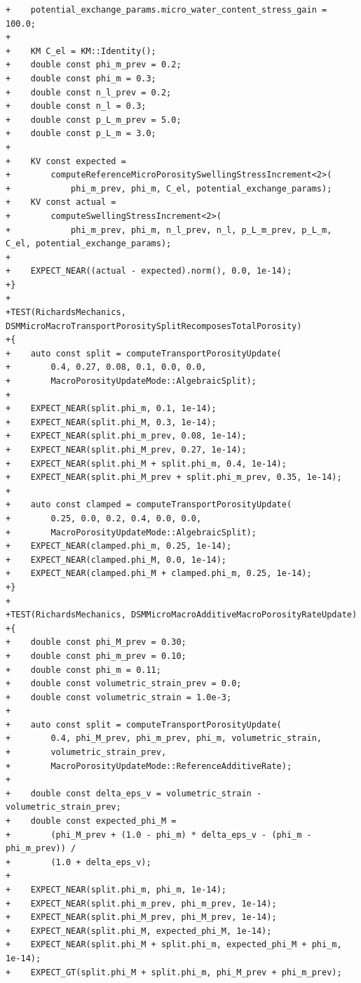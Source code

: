 \documentclass[10pt]{article}
\begin{document}
\begin{lstlisting}
+    potential_exchange_params.micro_water_content_stress_gain = 100.0;
+
+    KM C_el = KM::Identity();
+    double const phi_m_prev = 0.2;
+    double const phi_m = 0.3;
+    double const n_l_prev = 0.2;
+    double const n_l = 0.3;
+    double const p_L_m_prev = 5.0;
+    double const p_L_m = 3.0;
+
+    KV const expected =
+        computeReferenceMicroPorositySwellingStressIncrement<2>(
+            phi_m_prev, phi_m, C_el, potential_exchange_params);
+    KV const actual =
+        computeSwellingStressIncrement<2>(
+            phi_m_prev, phi_m, n_l_prev, n_l, p_L_m_prev, p_L_m, C_el, potential_exchange_params);
+
+    EXPECT_NEAR((actual - expected).norm(), 0.0, 1e-14);
+}
+
+TEST(RichardsMechanics, DSMMicroMacroTransportPorositySplitRecomposesTotalPorosity)
+{
+    auto const split = computeTransportPorosityUpdate(
+        0.4, 0.27, 0.08, 0.1, 0.0, 0.0,
+        MacroPorosityUpdateMode::AlgebraicSplit);
+
+    EXPECT_NEAR(split.phi_m, 0.1, 1e-14);
+    EXPECT_NEAR(split.phi_M, 0.3, 1e-14);
+    EXPECT_NEAR(split.phi_m_prev, 0.08, 1e-14);
+    EXPECT_NEAR(split.phi_M_prev, 0.27, 1e-14);
+    EXPECT_NEAR(split.phi_M + split.phi_m, 0.4, 1e-14);
+    EXPECT_NEAR(split.phi_M_prev + split.phi_m_prev, 0.35, 1e-14);
+
+    auto const clamped = computeTransportPorosityUpdate(
+        0.25, 0.0, 0.2, 0.4, 0.0, 0.0,
+        MacroPorosityUpdateMode::AlgebraicSplit);
+    EXPECT_NEAR(clamped.phi_m, 0.25, 1e-14);
+    EXPECT_NEAR(clamped.phi_M, 0.0, 1e-14);
+    EXPECT_NEAR(clamped.phi_M + clamped.phi_m, 0.25, 1e-14);
+}
+
+TEST(RichardsMechanics, DSMMicroMacroAdditiveMacroPorosityRateUpdate)
+{
+    double const phi_M_prev = 0.30;
+    double const phi_m_prev = 0.10;
+    double const phi_m = 0.11;
+    double const volumetric_strain_prev = 0.0;
+    double const volumetric_strain = 1.0e-3;
+
+    auto const split = computeTransportPorosityUpdate(
+        0.4, phi_M_prev, phi_m_prev, phi_m, volumetric_strain,
+        volumetric_strain_prev,
+        MacroPorosityUpdateMode::ReferenceAdditiveRate);
+
+    double const delta_eps_v = volumetric_strain - volumetric_strain_prev;
+    double const expected_phi_M =
+        (phi_M_prev + (1.0 - phi_m) * delta_eps_v - (phi_m - phi_m_prev)) /
+        (1.0 + delta_eps_v);
+
+    EXPECT_NEAR(split.phi_m, phi_m, 1e-14);
+    EXPECT_NEAR(split.phi_m_prev, phi_m_prev, 1e-14);
+    EXPECT_NEAR(split.phi_M_prev, phi_M_prev, 1e-14);
+    EXPECT_NEAR(split.phi_M, expected_phi_M, 1e-14);
+    EXPECT_NEAR(split.phi_M + split.phi_m, expected_phi_M + phi_m, 1e-14);
+    EXPECT_GT(split.phi_M + split.phi_m, phi_M_prev + phi_m_prev);

\end{lstlisting}
\end{document}
